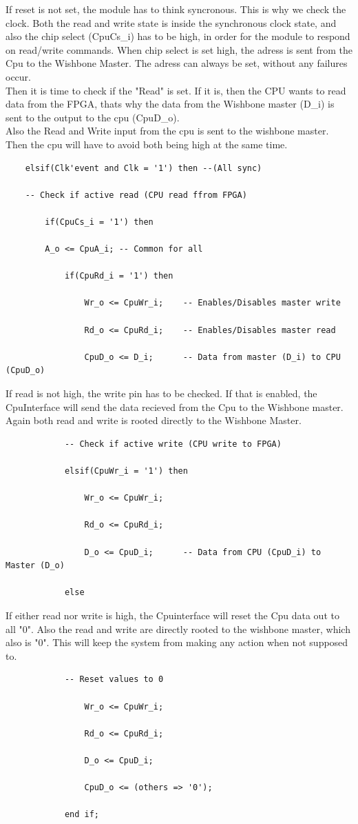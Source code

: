 If reset is not set, the module has to think syncronous. This is why we check the clock. Both the read and write state is inside the synchronous clock state, and also the chip select (CpuCs\_i) has to be high, in order for the module to respond on read/write commands. When chip select is set high, the adress is sent from the Cpu to the Wishbone Master. The adress can always be set, without any failures occur.\\
Then it is time to check if the "Read" is set. If it is, then the CPU wants to read data from the FPGA, thats why the data from the Wishbone master (D\_i) is sent to the output to the cpu (CpuD\_o).\\
Also the Read and Write input from the cpu is sent to the wishbone master. Then the cpu will have to avoid both being high at the same time. 
\begin{verbatim}
	elsif(Clk'event and Clk = '1') then --(All sync)	

	-- Check if active read (CPU read ffrom FPGA)

		if(CpuCs_i = '1') then

		A_o <= CpuA_i; -- Common for all

			if(CpuRd_i = '1') then

				Wr_o <= CpuWr_i; 	-- Enables/Disables master write

				Rd_o <= CpuRd_i; 	-- Enables/Disables master read

				CpuD_o <= D_i;		-- Data from master (D_i) to CPU (CpuD_o)
\end{verbatim}

If read is not high, the write pin has to be checked. If that is enabled, the CpuInterface will send the data recieved from the Cpu to the Wishbone master. Again both read and write is rooted directly to the Wishbone Master.
\begin{verbatim}
			-- Check if active write (CPU write to FPGA)

			elsif(CpuWr_i = '1') then

				Wr_o <= CpuWr_i;	

				Rd_o <= CpuRd_i;

				D_o <= CpuD_i;		-- Data from CPU (CpuD_i) to Master (D_o)

			else
\end{verbatim}


If either read nor write is high, the Cpuinterface will reset the Cpu data out to all "0". Also the read and write are directly rooted to the wishbone master, which also is "0". This will keep the system from making any action when not supposed to. 
\begin{verbatim}
			-- Reset values to 0

				Wr_o <= CpuWr_i;

				Rd_o <= CpuRd_i;

				D_o <= CpuD_i;

				CpuD_o <= (others => '0');

			end if;
\end{verbatim}

